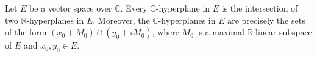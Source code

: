 Let $E$ be a vector space over $\mathbb{C}$. Every $\mathbb{C}$-hyperplane in $E$ is the intersection of two $\mathbb{R}$-hyperplanes in $E$. Moreover, the $\mathbb{C}$-hyperplanes in $E$ are precisely the sets of the form $(x_0 + M_0) \cap (y_0 + iM_0)$, where $M_0$ is a maximal $\mathbb{R}$-linear subspace of $E$ and $x_0, y_0 \in E$.
